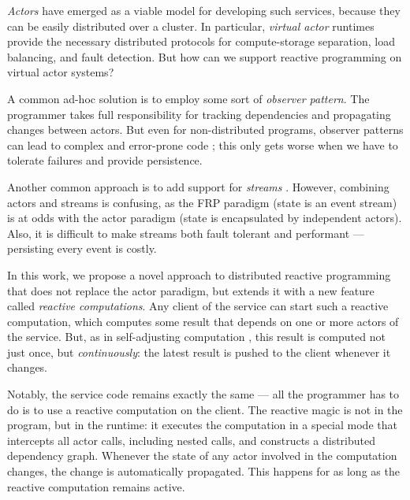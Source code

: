 \emph{Actors} have emerged as a viable model for developing such services, because they can be easily distributed over a cluster. In particular, \emph{virtual actor} runtimes provide the necessary distributed protocols for compute-storage separation, load balancing, and fault detection. But how can we support reactive programming on virtual actor systems?
 
A common ad-hoc solution is to employ some sort of \emph{observer pattern}. The programmer takes full responsibility for tracking dependencies and propagating changes between actors. But even for non-distributed programs, observer patterns can lead to complex and error-prone code \cite{}; this only gets worse when we have to tolerate failures and provide persistence. 

Another common approach is to add support for \emph{streams} \cite{}. However, combining actors and streams is confusing, as the FRP paradigm (state is an event stream) is at odds with the actor paradigm (state is encapsulated by independent actors). Also, it is difficult to make streams both fault tolerant and performant ---  persisting every event is costly. 

 In this work, we propose a novel approach to distributed reactive programming that does not replace the actor paradigm, but extends it with a new feature called \emph{reactive computations}. Any client of the service can start such a reactive computation, which computes some result that depends on one or more actors of the service. But, as in self-adjusting computation \cite{}, this result is computed not just once, but \emph{continuously}: the latest result is pushed to the client whenever it changes. 

Notably, the service code remains exactly the same ---  all the programmer has to do is to use a reactive computation on the client.  The reactive magic is not in the program, but in the runtime: it executes the computation in a special mode that intercepts all actor calls, including nested calls, and constructs a distributed dependency graph. Whenever the state of any actor involved in the computation changes, the change is automatically  propagated. This happens for as long as the reactive computation remains active. 


